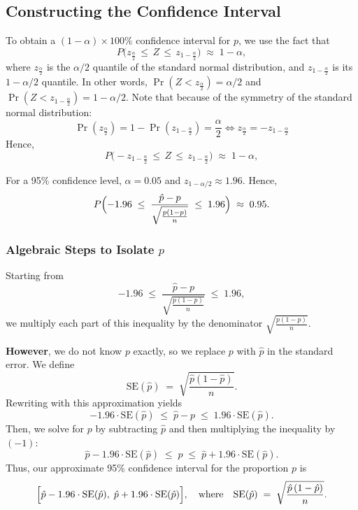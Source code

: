 \documentclass[11pt]{article}
\begin{document}
\subsection*{Constructing the Confidence Interval}

To obtain a \((1-\alpha) \times 100\%\) confidence interval for \(p\), we use the fact that
\[
  P\!\bigl(z_{\frac{\alpha}{2}} \,\le\, Z \,\le\, z_{1-\frac{\alpha}{2}}\bigr) \;\approx\; 1 - \alpha,
\]
where \(z_{\frac{\alpha}{2}}\) is the \(\alpha/2\) quantile of the standard normal distribution, and  \(z_{1-\frac{\alpha}{2}}\) is its \(1-\alpha/2\) quantile. In other words, \( \Pr(Z<z_{\frac{\alpha}{2}})=\alpha/2 \) and \( \Pr( Z < z_{1-\frac{\alpha}{2}} )=1-\alpha/2 \). Note that because of the symmetry of the standard normal distribution:
\[
\Pr(z_{\frac{\alpha}{2}})  = 1 - \Pr(z_{1-\frac{\alpha}{2}}) = \dfrac{\alpha}{2} \iff    z_{\frac{\alpha}{2}}  = - z_{1-\frac{\alpha}{2}}
\]
Hence,
\[
  P\!\bigl(-z_{1-\frac{\alpha}{2}}  \,\le\, Z \,\le\, z_{1-\frac{\alpha}{2}} \bigr) \;\approx\; 1 - \alpha,
\]

For a 95\% confidence level, \(\alpha = 0.05\) and \(z_{1-\alpha/2} \approx 1.96\). Hence,
\[
  P\Bigl(-1.96 \;\le\;
  \frac{\hat{p} - p}{\sqrt{\frac{p(1-p)}{n}}}
  \;\le\; 1.96\Bigr)
  \;\approx\; 0.95.
\]

\subsubsection*{Algebraic Steps to Isolate \(p\)}

Starting from
\[
  -1.96
  \;\le\;
  \frac{\hat{p} - p}{\sqrt{\frac{p(1-p)}{n}}}
  \;\le\;
  1.96,
\]
we multiply each part of this inequality by the denominator \(\sqrt{\frac{p(1-p)}{n}}.\)

\textbf{However}, we do not know \(p\) exactly, so we replace \(p\) with \(\hat{p}\) in the standard error. We define
\[
  \text{SE}(\hat{p}) \;=\; \sqrt{\frac{\hat{p}(1-\hat{p})}{n}}.
\]
Rewriting with this approximation yields
\[
  -1.96 \cdot \text{SE}(\hat{p})
  \;\le\;
  \hat{p} - p
  \;\le\;
  1.96 \cdot \text{SE}(\hat{p}).
\]
Then, we solve for \(p\) by subtracting \(\hat{p}\) and then multiplying the inequality by $(-1)$:
\[
  \hat{p} - 1.96  \cdot \text{SE}(\hat{p})
  \;\le\;
  p
  \;\le\;
  \hat{p} + 1.96  \cdot \text{SE}(\hat{p}).
\]
Thus, our approximate 95\% confidence interval for the proportion \(p\) is
\[
  \Bigl[
    \hat{p} - 1.96 \cdot \text{SE}(\hat{p}), \;
    \hat{p} + 1.96 \cdot \text{SE}(\hat{p})
  \Bigr],
  \quad
  \text{where}
  \quad
  \text{SE}(\hat{p})
  \;=\;
  \sqrt{\frac{\hat{p}\,(1-\hat{p})}{n}}.
\]
\end{document}
